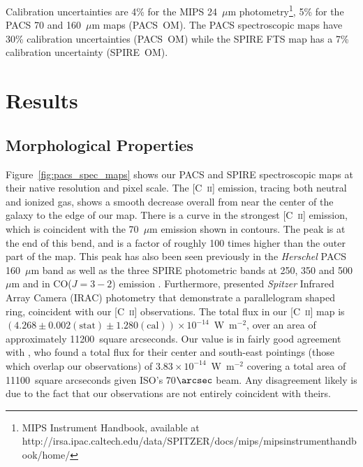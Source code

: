 \documentclass[preprint2]{aastex}
\begin{document}
Calibration uncertainties are 4\% for the MIPS 24~$\mu$m photometry\footnote{MIPS Instrument Handbook, available at http://irsa.ipac.caltech.edu/data/SPITZER/docs/mips/\-mipsinstrumenthandbook/home/}, 5\% for the PACS 70 and 160~$\mu$m maps (PACS~OM).  The PACS spectroscopic maps have 30\% calibration uncertainties (PACS~OM) while the SPIRE FTS map has a 7\% calibration uncertainty (SPIRE~OM).

\section{Results}\label{results}

\subsection{Morphological Properties}\label{properties}
Figure~\ref{fig:pacs_spec_maps} shows our PACS and SPIRE spectroscopic maps at their native resolution and pixel scale.  The [C~\textsc{ii}] emission, tracing both neutral and ionized gas, shows a smooth decrease overall from near the center of the galaxy to the edge of our map.  There is a curve in the strongest [C~\textsc{ii}] emission, which is coincident with the 70~$\mu$m emission shown in contours.  The peak is at the end of this bend, and is a factor of roughly 100 times higher than the outer part of the map.  This peak has also been seen previously in the \emph{Herschel} PACS 160~$\mu$m band as well as the three SPIRE photometric bands at 250, 350 and 500~$\mu$m and in CO($J=3-2$) emission \citep{2012MNRAS.422.2291P}.  Furthermore, \citet{2006ApJ...645.1092Q} presented \emph{Spitzer} Infrared Array Camera (IRAC) photometry that demonstrate a parallelogram shaped ring, coincident with our [C~\textsc{ii}] observations.  The total flux in our [C~\textsc{ii}] map is $(4.268 \pm 0.002 (\mathrm{stat}) \pm 1.280 (\mathrm{cal})) \times 10^{-14}$~W~m$^{-2}$, over an area of approximately 11200~square arcseconds.  Our value is in fairly good agreement with \citet{2000A&A...355..885U}, who found a total flux for their center and south-east pointings (those which overlap our observations) of $3.83 \times 10^{-14}$~W~m$^{-2}$ covering a total area of 11100~square arcseconds given ISO's 70$\arcsec$ beam.  Any disagreement likely is due to the fact that our observations are not entirely coincident with theirs.
\end{document}
